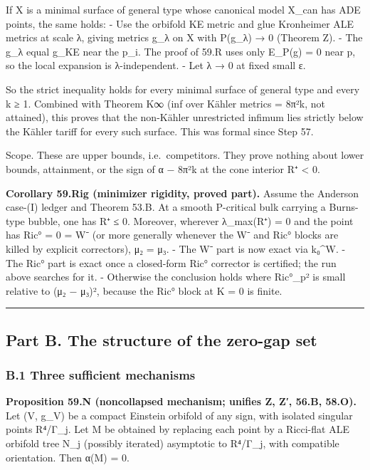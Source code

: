 \documentclass[
  10pt,
]{report}
\begin{document}
If X is a minimal surface of general type whose canonical model X\_can
has ADE points, the same holds: - Use the orbifold KE metric and glue
Kronheimer ALE metrics at scale λ, giving metrics g\_λ on X with P(g\_λ)
→ 0 (Theorem Z). - The g\_λ equal g\_KE near the p\_i. The proof of 59.R
uses only E\_P(g) = 0 near p, so the local expansion is λ-independent. -
Let λ → 0 at fixed small ε.

So the strict inequality holds for every minimal surface of general type
and every k ≥ 1. Combined with Theorem K∞ (inf over Kähler metrics =
8π²k, not attained), this proves that the non-Kähler unrestricted
infimum lies strictly below the Kähler tariff for every such surface.
This was formal since Step 57.

Scope. These are upper bounds, i.e.~competitors. They prove nothing
about lower bounds, attainment, or the sign of α − 8π²k at the cone
interior R⁺ \textless{} 0.

\textbf{Corollary 59.Rig (minimizer rigidity, proved part).} Assume the
Anderson case-(I) ledger and Theorem 53.B. At a smooth P-critical bulk
carrying a Burns-type bubble, one has R⁺ ≤ 0. Moreover, wherever
λ\_max(R⁺) = 0 and the point has Ric° = 0 = W⁻ (or more generally
whenever the W⁻ and Ric° blocks are killed by explicit correctors), μ₂ =
μ₃. - The W⁻ part is now exact via k₀\^{}W. - The Ric° part is exact
once a closed-form Ric° corrector is certified; the run above searches
for it. - Otherwise the conclusion holds where \textbar Ric°\_p\textbar²
is small relative to (μ₂ − μ₃)², because the Ric° block at K = 0 is
finite.

\begin{center}\rule{0.5\linewidth}{0.5pt}\end{center}

\hypertarget{part-b.-the-structure-of-the-zero-gap-set}{%
\subsection{Part B. The structure of the zero-gap
set}\label{part-b.-the-structure-of-the-zero-gap-set}}

\hypertarget{b.1-three-sufficient-mechanisms}{%
\subsubsection{B.1 Three sufficient
mechanisms}\label{b.1-three-sufficient-mechanisms}}

\textbf{Proposition 59.N (noncollapsed mechanism; unifies Z, Z′, 56.B,
58.O).} Let (V, g\_V) be a compact Einstein orbifold of any sign, with
isolated singular points R⁴/Γ\_j. Let M be obtained by replacing each
point by a Ricci-flat ALE orbifold tree N\_j (possibly iterated)
asymptotic to R⁴/Γ\_j, with compatible orientation. Then α(M) = 0.
\end{document}
